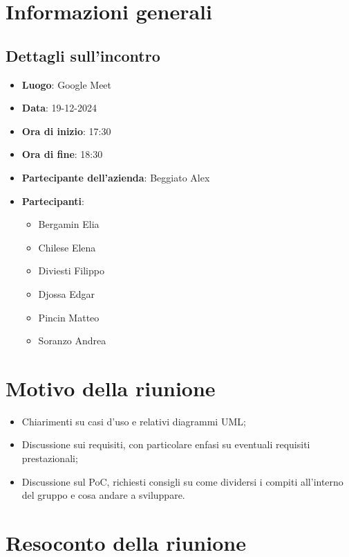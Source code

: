 \section{Informazioni generali}
\subsection{Dettagli sull'incontro}
\begin{itemize}
    \item \textbf{Luogo}: Google Meet
    \item \textbf{Data}: 19-12-2024
    \item \textbf{Ora di inizio}: 17:30
    \item \textbf{Ora di fine}: 18:30
    \item \textbf{Partecipante dell'azienda}: Beggiato Alex
    \item \textbf{Partecipanti}:
    \begin{itemize}
        \item Bergamin Elia
        \item Chilese Elena
        \item Diviesti Filippo
        \item Djossa Edgar
        \item Pincin Matteo 
        \item Soranzo Andrea  
    \end{itemize}
\end{itemize}

\section{Motivo della riunione}
\begin{itemize}
    \item Chiarimenti su casi d'uso e relativi diagrammi UML;
    \item Discussione sui requisiti, con particolare enfasi su eventuali requisiti prestazionali;
    \item Discussione sul PoC, richiesti consigli su come dividersi i compiti all'interno del gruppo e cosa andare a sviluppare.
\end{itemize}

\section{Resoconto della riunione}
